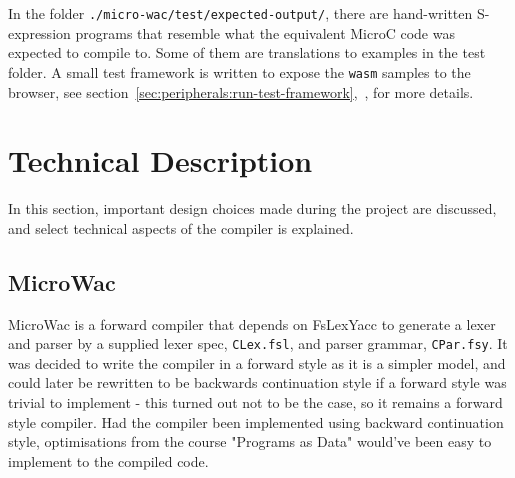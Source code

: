 \documentclass[a4paper]{article}
\begin{document}
In the folder \texttt{./micro-wac/test/expected-output/}, there are hand-written S-expression programs that resemble what the equivalent MicroC code was expected to compile to. Some of them are translations to examples in the test folder. A small test framework is written to expose the \texttt{wasm} samples to the browser, see section~\ref{sec:peripherals:run-test-framework},~, for more details.

\newpage
\section{Technical Description}
\label{sec:technical}
In this section, important design choices made during the project are discussed, and select technical aspects of the compiler is explained.

\subsection{MicroWac}
MicroWac is a forward compiler that depends on FsLexYacc to generate a lexer and parser by a supplied lexer spec, \texttt{CLex.fsl}, and parser grammar, \texttt{CPar.fsy}. It was decided to write the compiler in a forward style as it is a simpler model, and could later be rewritten to be backwards continuation style if a forward style was trivial to implement - this turned out not to be the case, so it remains a forward style compiler. Had the compiler been implemented using backward continuation style, optimisations from the course "Programs as Data" would've been easy to implement to the compiled code.
\end{document}
